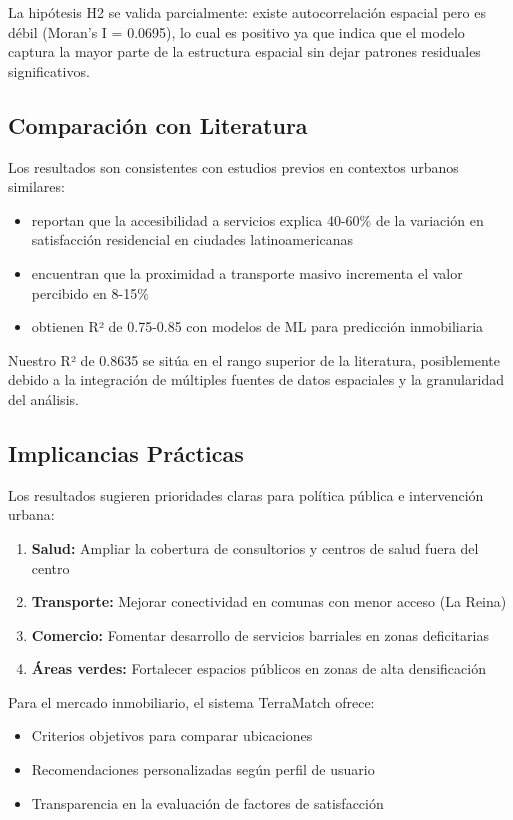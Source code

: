 \documentclass[11pt,letterpaper]{article}
\begin{document}
La hipótesis H2 se valida parcialmente: existe autocorrelación espacial pero es débil (Moran's I = 0.0695), lo cual es positivo ya que indica que el modelo captura la mayor parte de la estructura espacial sin dejar patrones residuales significativos.

\subsection{Comparación con Literatura}

Los resultados son consistentes con estudios previos en contextos urbanos similares:

\begin{itemize}
    \item \cite{alvarez2021} reportan que la accesibilidad a servicios explica 40-60\% de la variación en satisfacción residencial en ciudades latinoamericanas
    \item \cite{zhang2019} encuentran que la proximidad a transporte masivo incrementa el valor percibido en 8-15\%
    \item \cite{hoon2020} obtienen R² de 0.75-0.85 con modelos de ML para predicción inmobiliaria
\end{itemize}

Nuestro R² de 0.8635 se sitúa en el rango superior de la literatura, posiblemente debido a la integración de múltiples fuentes de datos espaciales y la granularidad del análisis.

\subsection{Implicancias Prácticas}

Los resultados sugieren prioridades claras para política pública e intervención urbana:

\begin{enumerate}
    \item \textbf{Salud:} Ampliar la cobertura de consultorios y centros de salud fuera del centro
    \item \textbf{Transporte:} Mejorar conectividad en comunas con menor acceso (La Reina)
    \item \textbf{Comercio:} Fomentar desarrollo de servicios barriales en zonas deficitarias
    \item \textbf{Áreas verdes:} Fortalecer espacios públicos en zonas de alta densificación
\end{enumerate}

Para el mercado inmobiliario, el sistema TerraMatch ofrece:
\begin{itemize}
    \item Criterios objetivos para comparar ubicaciones
    \item Recomendaciones personalizadas según perfil de usuario
    \item Transparencia en la evaluación de factores de satisfacción
\end{itemize}
\end{document}
